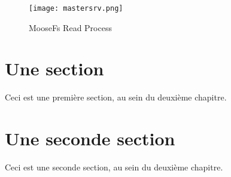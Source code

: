\documentclass[12pt]{report}
\begin{document}
\begin{figure}[p]
    \texttt{[image: mastersrv.png]}
    \caption{MooseFs Read Process}
    \label{identifiant test}
\end{figure} 

    \section{Une section}
    Ceci est une première section, au sein du deuxième chapitre.
    \section{Une seconde section}
    Ceci est une seconde section, au sein du deuxième chapitre.
\end{document}
